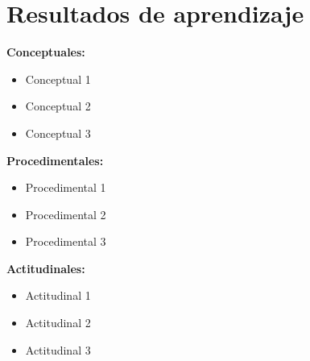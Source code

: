 \section{Resultados de aprendizaje}

\textbf{Conceptuales:}
\begin{itemize}
    \item Conceptual 1
    \item Conceptual 2
    \item Conceptual 3
\end{itemize}

\vspace{12pt}
\textbf{Procedimentales:}
\begin{itemize}
    \item Procedimental 1
    \item Procedimental 2
    \item Procedimental 3
\end{itemize}

\vspace{12pt}
\textbf{Actitudinales:}
\begin{itemize}
    \item Actitudinal 1
    \item Actitudinal 2
    \item Actitudinal 3
\end{itemize}
\pagebreak
